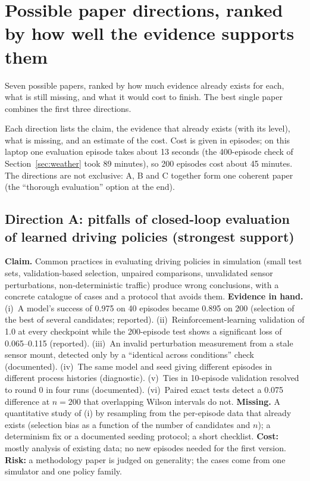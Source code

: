 \section{Possible paper directions, ranked by how well the evidence supports them}\label{sec:directions}

\begin{plainwords}
Seven possible papers, ranked by how much evidence already exists for each, what is still missing, and what it would cost to finish. The best single paper combines the first three directions.
\end{plainwords}


Each direction lists the claim, the evidence that already exists (with its level), what is missing, and an estimate of the cost. Cost is given in episodes; on this laptop one evaluation episode takes about 13 seconds (the 400-episode check of Section~\ref{sec:weather} took 89 minutes), so 200 episodes cost about 45 minutes.
The directions are not exclusive: A, B and C together form one coherent paper (the ``thorough evaluation'' option at the end).

\subsection{Direction A: pitfalls of closed-loop evaluation of learned driving policies (strongest support)}
\textbf{Claim.} Common practices in evaluating driving policies in simulation (small test sets, validation-based selection, unpaired comparisons, unvalidated sensor perturbations, non-deterministic traffic) produce wrong conclusions, with a concrete catalogue of cases and a protocol that avoids them.
\textbf{Evidence in hand.} (i)~A model's success of 0.975 on 40 episodes became 0.895 on 200 (selection of the best of several candidates; reported). (ii)~Reinforcement-learning validation of 1.0 at every checkpoint while the 200-episode test shows a significant loss of 0.065--0.115 (reported). (iii)~An invalid perturbation measurement from a stale sensor mount, detected only by a ``identical across conditions'' check (documented). (iv)~The same model and seed giving different episodes in different process histories (diagnostic).
(v)~Ties in 10-episode validation resolved to round 0 in four runs (documented). (vi)~Paired exact tests detect a 0.075 difference at $n=200$ that overlapping Wilson intervals do not.
\textbf{Missing.} A quantitative study of (i) by resampling from the per-episode data that already exists (selection bias as a function of the number of candidates and $n$); a determinism fix or a documented seeding protocol; a short checklist. \textbf{Cost:} mostly analysis of existing data; no new episodes needed for the first version.
\textbf{Risk:} a methodology paper is judged on generality; the cases come from one simulator and one policy family.

